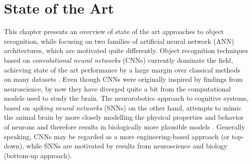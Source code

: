 \chapter{State of the Art}\label{chapter:state-of-the-art}
This chapter presents an overview of state of the art approaches to object recognition, while focusing on two families of artificial neural network (ANN) architectures, which are motivated quite differently. Object recognition techniques based on \emph{convolutional neural networks} (CNNs) currently dominate the field, achieving state of the art performance by a large margin over classical methods on many datasets \cite{Diba2017WeaklySC,7506134}. Even though CNNs were originally inspired by findings from neuroscience, by now they have diverged quite a bit from the computational models used to study the brain. The neurorobotics approach to cognitive systems, based on \emph{spiking neural networks} (SNNs) on the other hand, attempts to mimic the animal brain by more closely modelling the physical properties and behavior of neurons and therefore results in biologically more plausible models \cite{Schofield20180027}. Generally speaking, CNNs may be regarded as a more engineering-based approach (or top-down), while SNNs are motivated by results from neuroscience and biology (bottom-up approach).
